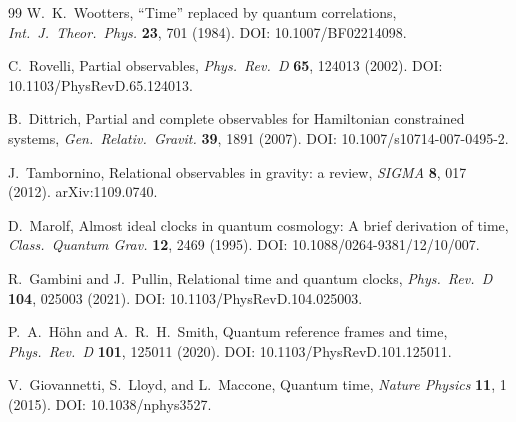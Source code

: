 \documentclass[pdflatex,sn-mathphys-num]{sn-jnl}
\theoremstyle{thmstylethree}
\theoremstyle{thmstyleone}
\theoremstyle{thmstyletwo}
\numberwithin{equation}{section}
\begin{document}
\begin{thebibliography}{99}
            W.~K.~Wootters,
            ``Time'' replaced by quantum correlations,
            \textit{Int.\ J.\ Theor.\ Phys.} \textbf{23}, 701 (1984).
            DOI: 10.1007/BF02214098.
            
            C.~Rovelli,
            Partial observables,
            \textit{Phys.\ Rev.\ D} \textbf{65}, 124013 (2002).
            DOI: 10.1103/PhysRevD.65.124013.
            
            B.~Dittrich,
            Partial and complete observables for Hamiltonian constrained systems,
            \textit{Gen.\ Relativ.\ Gravit.} \textbf{39}, 1891 (2007).
            DOI: 10.1007/s10714-007-0495-2.
            
            J.~Tambornino,
            Relational observables in gravity: a review,
            \textit{SIGMA} \textbf{8}, 017 (2012).
            arXiv:1109.0740.
            
            D.~Marolf,
            Almost ideal clocks in quantum cosmology: A brief derivation of time,
            \textit{Class.\ Quantum Grav.} \textbf{12}, 2469 (1995).
            DOI: 10.1088/0264-9381/12/10/007.
            
            R.~Gambini and J.~Pullin,
            Relational time and quantum clocks,
            \textit{Phys.\ Rev.\ D} \textbf{104}, 025003 (2021).
            DOI: 10.1103/PhysRevD.104.025003.
            
            P.~A.~H{\"o}hn and A.~R.~H.~Smith,
            Quantum reference frames and time,
            \textit{Phys.\ Rev.\ D} \textbf{101}, 125011 (2020).
            DOI: 10.1103/PhysRevD.101.125011.
            
            V.~Giovannetti, S.~Lloyd, and L.~Maccone,
            Quantum time,
            \textit{Nature Physics} \textbf{11}, 1 (2015).
            DOI: 10.1038/nphys3527.
        
        \end{thebibliography}
\end{document}
